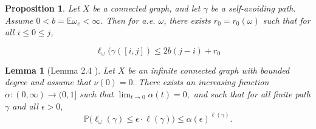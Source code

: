 \documentclass[12 pt]{amsart}
\newtheorem{proposition}[theorem]{Proposition}
\newtheorem{lemma}[theorem]{Lemma}
\theoremstyle{definition}
\theoremstyle{remark}
\begin{document}
\begin{proposition}\cite{BT17}\label{BT1}
Let $X$ be a connected graph, and let $\gamma$ be a self-avoiding path. Assume $0<b=\mathbb{E} \omega_{e}<\infty$. Then for a.e. $\omega$, there exists $r_{0}=r_{0}(\omega)$ such that for all $i \leq 0 \leq j$,

$$
\ell_{\omega}(\gamma([i, j]) \leq 2 b(j-i)+r_{0}
$$
\end{proposition} 
\begin{lemma}[Lemma 2.4 \cite{BT17}] \label{lemma2.13} Let $X$ be an infinite connected graph with bounded degree and assume that $\nu({0})=0.$ There exists an increasing function $\alpha:(0,\infty)\to (0,1]$ such that $\lim_{t\to0}\alpha(t) = 0,$ and such that for all finite path $\gamma$ and all $\epsilon>0,$
$$\mathbb{P}\big(\ell_\omega(\gamma)\leq \epsilon\cdot \ell(\gamma)\big) \leq \alpha(\epsilon)^{\ell(\gamma)}.$$
\end{lemma}
\end{document}
